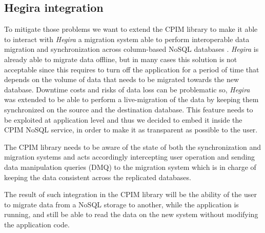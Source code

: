 \subsection{Hegira integration}
To mitigate those problems we want to extend the CPIM library to make it able to interact with \textit{Hegira} a migration system able to perform interoperable data migration and synchronization across column-based NoSQL databases \cite{paper:modaclouds-deliverable}. \textit{Hegira} is already able to migrate data offline, but in many cases this solution is not acceptable since this requires to turn off the application for a period of time that depends on the volume of data that needs to be migrated towards the new database. 
Downtime costs and risks of data loss can be problematic so, \textit{Hegira} was extended to be able to perform a live-migration of the data by keeping them synchronized on the source and the destination database.
This feature needs to be exploited at application level and thus we decided to embed it inside the CPIM NoSQL service, in order to make it as transparent as possible to the user.

\noindent The CPIM library needs to be aware of the state of both the synchronization and migration systems and acts accordingly intercepting user operation and sending data manipulation queries (DMQ) to the migration system which is in charge of keeping the data consistent across the replicated databases.

\noindent The result of such integration in the CPIM library will be the ability of the user to migrate data from a NoSQL storage to another, while the application is running, and still be able to read the data on the new system without modifying the application code.